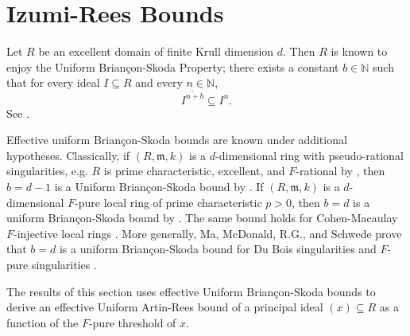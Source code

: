 \documentclass[12pt]{amsart}
\numberwithin{equation}{theorem}
\theoremstyle{plain}
\newcommand{\fm}{\mathfrak{m}}
\newcommand{\NN}{\mathbb{N}}
\begin{document}
\section{Izumi-Rees Bounds}

Let $R$ be an excellent domain of finite Krull dimension $d$.
Then $R$ is known to enjoy the Uniform Brian\c{c}on-Skoda Property; there exists a constant $b\in\NN$ such that for every ideal $I\subseteq R$ and every $n\in\NN$,
\[
    \overline{I^{n+b}}\subseteq I^n.
\]
See \cite{MaMcDonaldRGSchwede2026,Huneke1992}.

Effective uniform Brian\c{c}on-Skoda bounds are known under additional hypotheses. Classically, if $(R,\fm,k)$ is a $d$-dimensional ring with pseudo-rational singularities, e.g. $R$ is prime characteristic, excellent, and $F$-rational by \cite{Smith1997}, then $b=d-1$ is a Uniform Brian\c{c}on-Skoda bound by \cite{LipmanSathaye1981}. If $(R,\fm,k)$ is a $d$-dimensional $F$-pure local ring of prime characteristic $p>0$, then $b=d$ is a uniform Brian\c{c}on-Skoda bound by \cite[Corollary~3.3]{WheelerZhang2025}. The same bound holds for Cohen-Macaulay $F$-injective local rings \cite[Corollary~3.12]{WheelerZhang2025}. More generally, Ma, McDonald, R.G., and Schwede prove that $b=d$ is a uniform Brian\c{c}on-Skoda bound for Du Bois singularities and $F$-pure singularities \cite[Theorem~3.18]{MaMcDonaldRGSchwede2026}.

The results of this section uses effective Uniform Brian\c{c}on-Skoda bounds to derive an effective Uniform Artin-Rees bound of a principal ideal $(x)\subseteq R$ as a function of the $F$-pure threshold of $x$.
\end{document}

